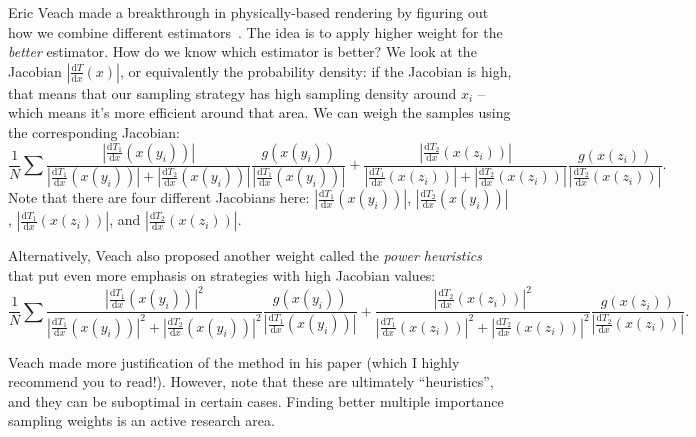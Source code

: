 Eric Veach made a breakthrough in physically-based rendering by figuring out how we combine different estimators~\cite{Veach:1995:OCS}. The idea is to apply higher weight for the \emph{better} estimator. How do we know which estimator is better? We look at the Jacobian $|\frac{\mathrm{d}T}{\mathrm{d}x}(x)|$, or equivalently the probability density: if the Jacobian is high, that means that our sampling strategy has high sampling density around $x_i$ -- which means it's more efficient around that area. We can weigh the samples using the corresponding Jacobian:
\begin{equation}
\frac{1}{N} \sum
\frac{\left|\frac{\mathrm{d}T_1}{\mathrm{d}x}(x(y_i))\right|}{\left|\frac{\mathrm{d}T_1}{\mathrm{d}x}(x(y_i))\right| + \left|\frac{\mathrm{d}T_2}{\mathrm{d}x}(x(y_i))\right|}
\frac{g(x(y_i))}{\left|\frac{\mathrm{d}T_1}{\mathrm{d}x}(x(y_i))\right|} + 
\frac{\left|\frac{\mathrm{d}T_2}{\mathrm{d}x}(x(z_i))\right|}{\left|\frac{\mathrm{d}T_1}{\mathrm{d}x}(x(z_i))\right| + \left|\frac{\mathrm{d}T_2}{\mathrm{d}x}(x(z_i))\right|}
\frac{g(x(z_i))}{\left|\frac{\mathrm{d}T_2}{\mathrm{d}x}(x(z_i))\right|}.
\end{equation}
Note that there are four different Jacobians here: $\left|\frac{\mathrm{d}T_1}{\mathrm{d}x}(x(y_i))\right|$, $\left|\frac{\mathrm{d}T_2}{\mathrm{d}x}(x(y_i))\right|$, $\left|\frac{\mathrm{d}T_1}{\mathrm{d}x}(x(z_i))\right|$, and $\left|\frac{\mathrm{d}T_2}{\mathrm{d}x}(x(z_i))\right|$.

Alternatively, Veach also proposed another weight called the \emph{power heuristics} that put even more emphasis on strategies with high Jacobian values:
\begin{equation}
\frac{1}{N} \sum
\frac{\left|\frac{\mathrm{d}T_1}{\mathrm{d}x}(x(y_i))\right|^2}{\left|\frac{\mathrm{d}T_1}{\mathrm{d}x}(x(y_i))\right|^2 + \left|\frac{\mathrm{d}T_2}{\mathrm{d}x}(x(y_i))\right|^2}
\frac{g(x(y_i))}{|\frac{\mathrm{d}T_1}{\mathrm{d}x}(x(y_i))|} + 
\frac{\left|\frac{\mathrm{d}T_2}{\mathrm{d}x}(x(z_i))\right|^2}{\left|\frac{\mathrm{d}T_1}{\mathrm{d}x}(x(z_i))\right|^2 + \left|\frac{\mathrm{d}T_2}{\mathrm{d}x}(x(z_i))\right|^2}
\frac{g(x(z_i))}{\left|\frac{\mathrm{d}T_2}{\mathrm{d}x}(x(z_i))\right|}.
\end{equation}

Veach made more justification of the method in his paper (which I highly recommend you to read!). However, note that these are ultimately ``heuristics'', and they can be suboptimal in certain cases. Finding better multiple importance sampling weights is an active research area.

